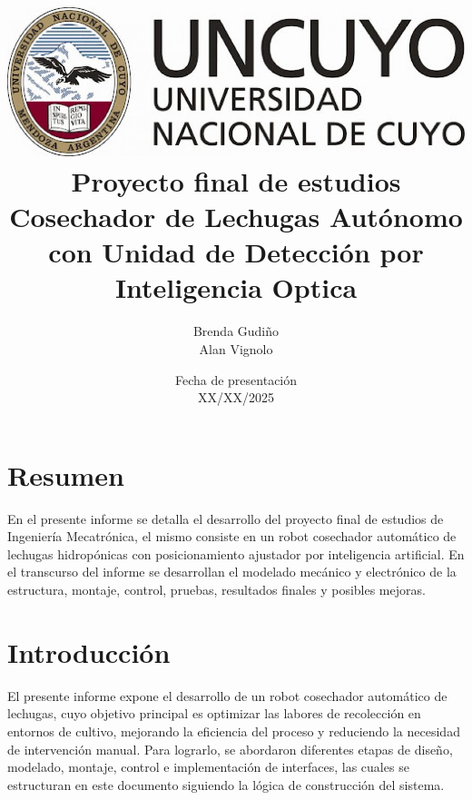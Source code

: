 \documentclass[a4paper]{report}
\title{
\includegraphics[scale = 0.3]{logo_uncuyo.png} \\ [2cm]
{\Huge \textbf{Proyecto final de estudios} \\ [1cm] 
Cosechador de Lechugas Autónomo con Unidad de Detección por Inteligencia Optica}}
\author{Brenda Gudiño \\ Alan Vignolo}
\date{Fecha de presentación \\ XX/XX/2025}
\begin{document}
\maketitle
\tableofcontents


\newpage
\chapter{Resumen}
En el presente informe se detalla el desarrollo del proyecto final de estudios de Ingeniería Mecatrónica, el mismo consiste en un robot cosechador automático de lechugas hidropónicas con posicionamiento ajustador por inteligencia artificial. En el transcurso del informe se desarrollan el modelado mecánico y electrónico de la estructura, montaje, control, pruebas, resultados finales y posibles mejoras.
\newpage
\chapter{Introducción}
El presente informe expone el desarrollo de un robot cosechador automático de lechugas, cuyo objetivo principal es optimizar las labores de recolección en entornos de cultivo, mejorando la eficiencia del proceso y reduciendo la necesidad de intervención manual. Para lograrlo, se abordaron diferentes etapas de diseño, modelado, montaje, control e implementación de interfaces, las cuales se estructuran en este documento siguiendo la lógica de construcción del sistema.
\end{document}
